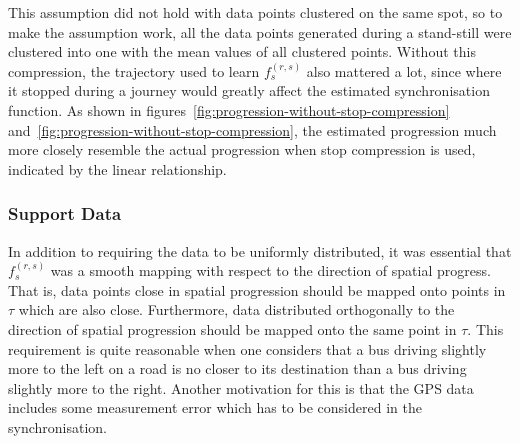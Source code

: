 \noindent
This assumption did not hold with data points clustered on the same spot, so to make the assumption work, all the data points generated during a stand-still were clustered into one with the mean values of all clustered points. Without this compression, the trajectory used to learn $f^{(r,s)}_s$ also mattered a lot, since where it stopped during a journey would greatly affect the estimated synchronisation function. As shown in figures~\ref{fig:progression-without-stop-compression} and~\ref{fig:progression-without-stop-compression}, the estimated progression much more closely resemble the actual progression when stop compression is used, indicated by the linear relationship.

\subsubsection{Support Data}
In addition to requiring the data to be uniformly distributed, it was essential that $f^{(r,s)}_s$ was a smooth mapping with respect to the direction of spatial progress. That is, data points close in spatial progression should be mapped onto points in $\tau$ which are also close. Furthermore, data distributed orthogonally to the direction of spatial progression should be mapped onto the same point in $\tau$. This requirement is quite reasonable when one considers that a bus driving slightly more to the left on a road is no closer to its destination than a bus driving slightly more to the right. Another motivation for this is that the GPS data includes some measurement error which has to be considered in the synchronisation.

